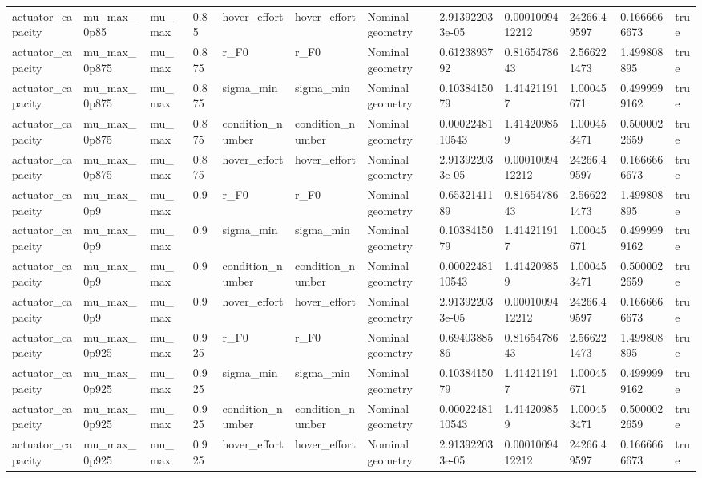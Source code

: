 \begin{tabular}{@{}llllllllllll@{}}
actuator\_capacity & mu\_max\_0p85 & mu\_max & 0.85 & hover\_effort & hover\_effort & Nominal geometry & 2.913922033e-05 & 0.0001009412212 & 24266.49597 & 0.1666666673 & true \\
actuator\_capacity & mu\_max\_0p875 & mu\_max & 0.875 & r\_F0 & r\_F0 & Nominal geometry & 0.6123893792 & 0.8165478643 & 2.566221473 & 1.499808895 & true \\
actuator\_capacity & mu\_max\_0p875 & mu\_max & 0.875 & sigma\_min & sigma\_min & Nominal geometry & 0.1038415079 & 1.414211917 & 1.00045671 & 0.4999999162 & true \\
actuator\_capacity & mu\_max\_0p875 & mu\_max & 0.875 & condition\_number & condition\_number & Nominal geometry & 0.0002248110543 & 1.414209859 & 1.000453471 & 0.5000022659 & true \\
actuator\_capacity & mu\_max\_0p875 & mu\_max & 0.875 & hover\_effort & hover\_effort & Nominal geometry & 2.913922033e-05 & 0.0001009412212 & 24266.49597 & 0.1666666673 & true \\
actuator\_capacity & mu\_max\_0p9 & mu\_max & 0.9 & r\_F0 & r\_F0 & Nominal geometry & 0.6532141189 & 0.8165478643 & 2.566221473 & 1.499808895 & true \\
actuator\_capacity & mu\_max\_0p9 & mu\_max & 0.9 & sigma\_min & sigma\_min & Nominal geometry & 0.1038415079 & 1.414211917 & 1.00045671 & 0.4999999162 & true \\
actuator\_capacity & mu\_max\_0p9 & mu\_max & 0.9 & condition\_number & condition\_number & Nominal geometry & 0.0002248110543 & 1.414209859 & 1.000453471 & 0.5000022659 & true \\
actuator\_capacity & mu\_max\_0p9 & mu\_max & 0.9 & hover\_effort & hover\_effort & Nominal geometry & 2.913922033e-05 & 0.0001009412212 & 24266.49597 & 0.1666666673 & true \\
actuator\_capacity & mu\_max\_0p925 & mu\_max & 0.925 & r\_F0 & r\_F0 & Nominal geometry & 0.6940388586 & 0.8165478643 & 2.566221473 & 1.499808895 & true \\
actuator\_capacity & mu\_max\_0p925 & mu\_max & 0.925 & sigma\_min & sigma\_min & Nominal geometry & 0.1038415079 & 1.414211917 & 1.00045671 & 0.4999999162 & true \\
actuator\_capacity & mu\_max\_0p925 & mu\_max & 0.925 & condition\_number & condition\_number & Nominal geometry & 0.0002248110543 & 1.414209859 & 1.000453471 & 0.5000022659 & true \\
actuator\_capacity & mu\_max\_0p925 & mu\_max & 0.925 & hover\_effort & hover\_effort & Nominal geometry & 2.913922033e-05 & 0.0001009412212 & 24266.49597 & 0.1666666673 & true \\

\end{tabular}
